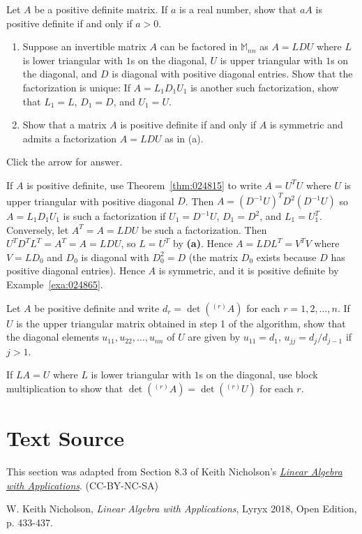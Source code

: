 \documentclass{ximera}
\begin{document}
\begin{problem}\label{prob:pos_def_11}
Let $A$ be a positive definite matrix. If $a$ is a real number, show that $aA$ is positive definite if and only if $a > 0$.
\end{problem}

\begin{problem}\label{prob:pos_def_12}
\begin{enumerate}
\item Suppose an invertible matrix $A$ can be factored in $\mathbb{M}_{nn}$ as $A = LDU$ where $L$ is lower triangular with $1$s on the diagonal, $U$ is upper triangular with $1$s on the diagonal, and $D$ is diagonal with positive diagonal entries. Show that the factorization is unique: If $A = L_{1}D_{1}U_{1}$ is another such factorization, show that $L_{1} = L$, $D_{1} = D$, and $U_{1} = U$.

\item Show that a matrix $A$ is positive definite if and only if $A$ is symmetric and admits a factorization $A = LDU$ as in (a).
\end{enumerate}

Click the arrow for answer.
\begin{expandable}{}{}
If $A$ is positive definite, use Theorem~\ref{thm:024815} to write $A = U^{T}U$ where $U$ is upper triangular with positive diagonal $D$. Then $A = (D^{-1}U)^{T}D^{2}(D^{-1}U)$ so $A = L_{1}D_{1}U_{1}$ is such a factorization if $U_{1} = D^{-1}U$, $D_{1} = D^{2}$, and $L_{1} = U^T_1$. Conversely, let $A^{T} = A = LDU$ be such a factorization. Then $U^{T}D^{T}L^{T} = A^{T} = A = LDU$, so $L = U^{T}$ by \textbf{(a)}. Hence $A = LDL^{T} = V^{T}V$ where $V = LD_{0}$ and $D_{0}$ is diagonal with $D^2_0 = D$ (the matrix $D_{0}$ exists because $D$ has positive diagonal entries). Hence $A$ is symmetric, and it is positive definite by Example~\ref{exa:024865}.
\end{expandable}
\end{problem}


\begin{problem}\label{prob:pos_def_13}
Let $A$ be positive definite and write $d_{r} = \det{\left(^{(r)}A\right)}$ for each $r = 1, 2, \dots, n$. If $U$ is the upper triangular matrix obtained in step 1 of the algorithm, show that the diagonal elements $u_{11}, u_{22}, \dots, u_{nn}$ of $U$ are given by $u_{11} = d_{1}$, $u_{jj} = d_{j} / d_{j-1}$ if $j > 1$. 
\begin{hint}
If $LA = U$ where $L$ is lower triangular with $1$s on the diagonal, use block multiplication to show that $\det{\left(^{(r)}A\right)} = \det{\left(^{(r)}U\right)}$ for each $r$.
\end{hint}
\end{problem}

\section*{Text Source} This section was adapted from Section 8.3 of Keith Nicholson's \href{https://open.umn.edu/opentextbooks/textbooks/linear-algebra-with-applications}{\it Linear Algebra with Applications}. (CC-BY-NC-SA)

W. Keith Nicholson, {\it Linear Algebra with Applications}, Lyryx 2018, Open Edition, p. 433-437.
\end{document}
